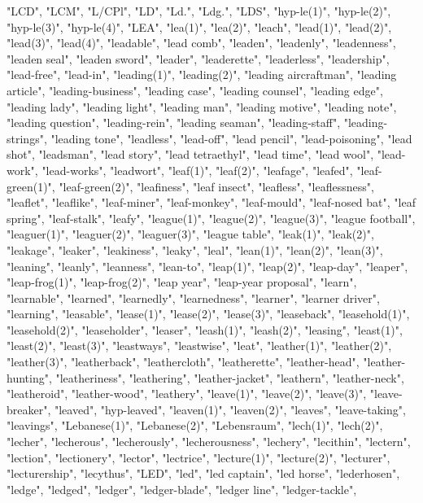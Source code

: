 "LCD",
"LCM",
"L/CPl",
"LD",
"Ld.",
"Ldg.",
"LDS",
"hyp-le(1)",
"hyp-le(2)",
"hyp-le(3)",
"hyp-le(4)",
"LEA",
"lea(1)",
"lea(2)",
"leach",
"lead(1)",
"lead(2)",
"lead(3)",
"lead(4)",
"leadable",
"lead comb",
"leaden",
"leadenly",
"leadenness",
"leaden seal",
"leaden sword",
"leader",
"leaderette",
"leaderless",
"leadership",
"lead-free",
"lead-in",
"leading(1)",
"leading(2)",
"leading aircraftman",
"leading article",
"leading-business",
"leading case",
"leading counsel",
"leading edge",
"leading lady",
"leading light",
"leading man",
"leading motive",
"leading note",
"leading question",
"leading-rein",
"leading seaman",
"leading-staff",
"leading-strings",
"leading tone",
"leadless",
"lead-off",
"lead pencil",
"lead-poisoning",
"lead shot",
"leadsman",
"lead story",
"lead tetraethyl",
"lead time",
"lead wool",
"lead-work",
"lead-works",
"leadwort",
"leaf(1)",
"leaf(2)",
"leafage",
"leafed",
"leaf-green(1)",
"leaf-green(2)",
"leafiness",
"leaf insect",
"leafless",
"leaflessness",
"leaflet",
"leaflike",
"leaf-miner",
"leaf-monkey",
"leaf-mould",
"leaf-nosed bat",
"leaf spring",
"leaf-stalk",
"leafy",
"league(1)",
"league(2)",
"league(3)",
"league football",
"leaguer(1)",
"leaguer(2)",
"leaguer(3)",
"league table",
"leak(1)",
"leak(2)",
"leakage",
"leaker",
"leakiness",
"leaky",
"leal",
"lean(1)",
"lean(2)",
"lean(3)",
"leaning",
"leanly",
"leanness",
"lean-to",
"leap(1)",
"leap(2)",
"leap-day",
"leaper",
"leap-frog(1)",
"leap-frog(2)",
"leap year",
"leap-year proposal",
"learn",
"learnable",
"learned",
"learnedly",
"learnedness",
"learner",
"learner driver",
"learning",
"leasable",
"lease(1)",
"lease(2)",
"lease(3)",
"leaseback",
"leasehold(1)",
"leasehold(2)",
"leaseholder",
"leaser",
"leash(1)",
"leash(2)",
"leasing",
"least(1)",
"least(2)",
"least(3)",
"leastways",
"leastwise",
"leat",
"leather(1)",
"leather(2)",
"leather(3)",
"leatherback",
"leathercloth",
"leatherette",
"leather-head",
"leather-hunting",
"leatheriness",
"leathering",
"leather-jacket",
"leathern",
"leather-neck",
"leatheroid",
"leather-wood",
"leathery",
"leave(1)",
"leave(2)",
"leave(3)",
"leave-breaker",
"leaved",
"hyp-leaved",
"leaven(1)",
"leaven(2)",
"leaves",
"leave-taking",
"leavings",
"Lebanese(1)",
"Lebanese(2)",
"Lebensraum",
"lech(1)",
"lech(2)",
"lecher",
"lecherous",
"lecherously",
"lecherousness",
"lechery",
"lecithin",
"lectern",
"lection",
"lectionery",
"lector",
"lectrice",
"lecture(1)",
"lecture(2)",
"lecturer",
"lecturership",
"lecythus",
"LED",
"led",
"led captain",
"led horse",
"lederhosen",
"ledge",
"ledged",
"ledger",
"ledger-blade",
"ledger line",
"ledger-tackle",
